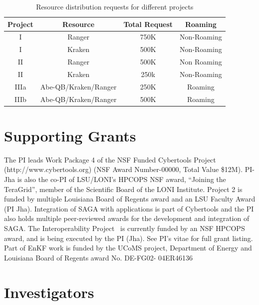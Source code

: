 \documentclass[a4paper,10pt]{article}
\begin{document}
\begin{table}[!h]
\begin{center}
  \caption{Resource distribution requests for different projects  \newline}
\label{table:systems}
\begin{tabular}{|c| c | c | c | }
\hline 
Project & Resource & Total Request & Roaming \\
\hline
I & Ranger  & 750K & Non-Roaming \\
I & Kraken &  500K  & Non-Roaming \\
\hline
II & Ranger & 500K & Non Roaming \\
II & Kraken & 250k & Non-Roaming \\
\hline
IIIa & Abe-QB/Kraken/Ranger & 250K & Roaming \\
IIIb & Abe-QB/Kraken/Ranger & 500K & Roaming \\
\hline
\end{tabular}
\end{center}
\end{table}

\section*{Supporting Grants}
 The PI leads Work Package 4 of the NSF Funded Cybertools Project (http://www.cybertools.org) (NSF Award Number-00000, Total Value \$12M).  PI-Jha is also the co-PI of LSU/LONI's HPCOPS NSF award, ``Joining the TeraGrid'', member of the Scientific Board of the LONI Institute.  Project 2 is funded by multiple Louisiana Board of Regents award and an LSU Faculty Award (PI Jha). Integration of SAGA with applications is part of Cybertools and the PI also holds multiple peer-reviewed awards for the development and integration of SAGA.  The Interoperability Project~\cite{interop_url} is currently funded by an NSF HPCOPS award, and is being executed by the PI (Jha). See PI's vitae for full grant listing. Part of EnKF work is funded by the UCoMS project, Department of Energy and Louisiana Board of Regents award No. DE-FG02- 04ER46136


\section*{Investigators}







%
%
\end{document}
